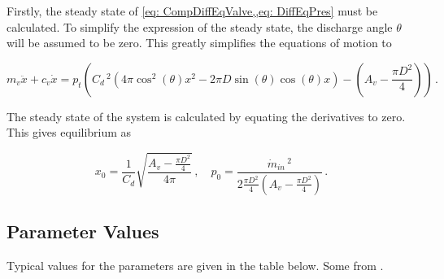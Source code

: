 
Firstly, the steady state of \cref{eq: CompDiffEqValve,,eq: DiffEqPres} must be calculated. To simplify the expression of the steady state, the discharge angle $\theta$ will be assumed to be zero. This greatly simplifies the equations of motion to

\begin{equation} \label{eq: ClosingDiffEqFull}
    m_v \ddot{x} + c_v \dot{x} = p_t \left(
    C_d \,^2 \left( 4 \pi \cos^2(\theta) x^2
    - 2 \pi D \sin(\theta) \cos(\theta) x \right)
    - \left( A_v - \frac{\pi D^2}{4} \right)
    \right) \, .
\end{equation}

The steady state of the system is calculated by equating the derivatives to zero. This gives equilibrium as

\begin{equation*}
    x_0 = \frac{1}{C_d} \sqrt{\frac{A_v - \frac{\pi D^2}{4}}{4 \pi}}
    \, , \quad
    p_0 = \frac{\dot{m}_{in} \,^2}{2 \frac{\pi D^2}{4} \left( A_v - \frac{\pi D^2}{4} \right)} \, .
\end{equation*}



\subsection{Parameter Values}

Typical values for the parameters are given in the table below. Some from \cite{Hos2016DynamicService}.

